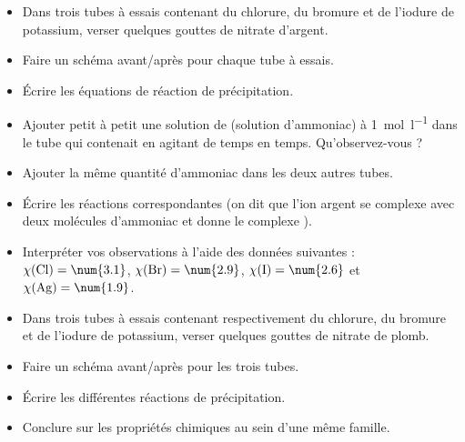 \documentclass{tp}
\begin{document}
\begin{itemize}
  \item Dans trois tubes à essais contenant du chlorure, du bromure et de l'iodure de potassium, verser quelques gouttes de nitrate d'argent.

  \item Faire un schéma avant/après pour chaque tube à essais.

  \item Écrire les équations de réaction de précipitation.

  \item Ajouter petit à petit une solution de  (solution d'ammoniac) à \SI{1}{\mole\per\litre} dans le tube qui contenait  en agitant de temps en temps. Qu'observez-vous ? 

  \item Ajouter la même quantité d'ammoniac dans les deux autres tubes.

  \item Écrire les réactions correspondantes (on dit que l'ion argent se complexe avec deux molécules d'ammoniac et
donne le complexe ).

  \item Interpréter vos observations à l'aide des données suivantes : $\chi(\ce{Cl})=\num{3.1}$, $\chi(\ce{Br})=\num{2.9}$, $\chi(\ce{I})=\num{2.6}$ et $\chi(\ce{Ag})=\num{1.9}$.

  \item Dans trois tubes à essais contenant respectivement du chlorure, du bromure et de l'iodure de potassium, verser quelques gouttes de nitrate de plomb.

  \item Faire un schéma avant/après pour les trois tubes.

  \item Écrire les différentes réactions de précipitation.

  \item Conclure sur les propriétés chimiques au sein d'une même famille.
\end{itemize}
\end{document}
